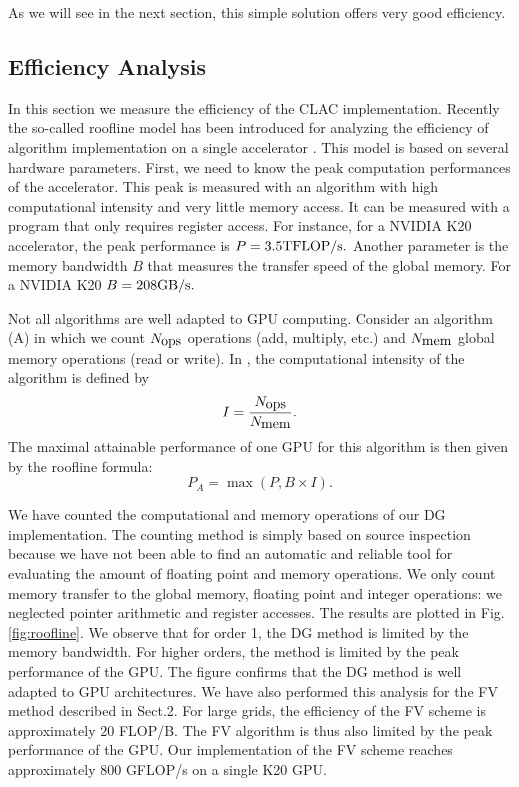 \documentclass{svmult}
\begin{document}
As we will see in the next section, this simple solution offers very
good efficiency.

\subsection{Efficiency Analysis}
In this section we measure the efficiency of the CLAC
implementation. Recently the so-called roofline model has been
introduced for analyzing the efficiency of algorithm implementation on
a single accelerator \cite{williams2009roofline}. This model is based
on several hardware parameters.  First, we need to know the peak
computation performances of the accelerator. This peak is measured
with an algorithm with high computational intensity and very little
memory access. It can be measured with a program that only requires
register access. For instance, for a NVIDIA K20 accelerator, the peak
performance is $P=3.5\hbox{TFLOP/s}.$ Another parameter is the memory
bandwidth $B$ that measures the transfer speed of the global
memory. For a NVIDIA K20 $B=208\hbox{GB/s}.$


Not all algorithms are well adapted to GPU computing. Consider an
algorithm (A) in which we count $N_{\hbox{ops}}$ operations (add,
multiply, etc.) and $N_{\hbox{mem}}$ global memory operations (read or
write). In \cite{williams2009roofline}, the computational intensity of
the algorithm is defined by
\begin{equation}I=\frac{N_{\hbox{ops}}}{N_{\hbox{mem}}}.\end{equation}
The maximal attainable performance of one GPU for this algorithm is then given by the roofline formula:
\[
P_{A}=\max(P,B\times I).
\]

We have counted the computational and memory operations of our DG
implementation. The counting method is simply based on source
inspection because we have not been able to find an automatic and
reliable tool for evaluating the amount of floating point and memory
operations. We only count memory transfer to the global memory,
floating point and integer operations: we neglected pointer
arithmetic and register accesses.  The results are plotted in
Fig.\ref{fig:roofline}. We observe that for order 1, the DG method is
limited by the memory bandwidth.  For higher orders, the method is
limited by the peak performance of the GPU. The figure confirms that
the DG method is well adapted to GPU architectures.  We have also
performed this analysis for the FV method described in Sect.2. For
large grids, the efficiency of the FV scheme is approximately $20$
FLOP/B. The FV algorithm is thus also limited by the peak performance
of the GPU. Our implementation of the FV scheme reaches approximately
$800$ GFLOP/s on a single K20 GPU.
\end{document}
